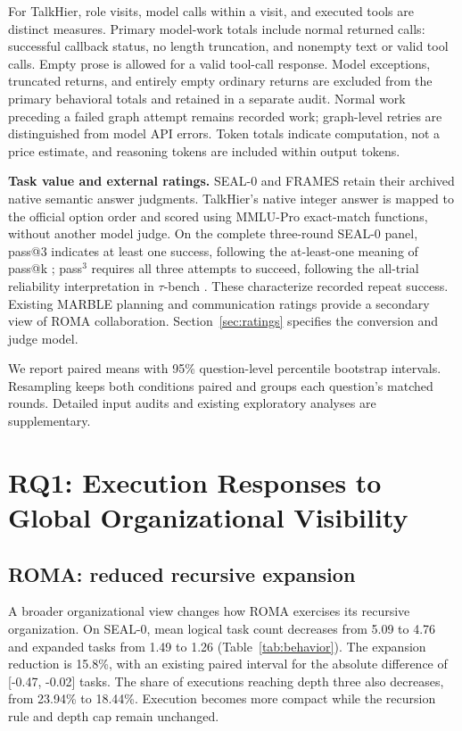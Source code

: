 \documentclass[10pt,letterpaper,twocolumn]{article}
\begin{document}
For TalkHier, role visits, mod\-el calls within a visit, and ex\-e\-cut\-ed tools are distinct mea\-sures. Primary mod\-el-work totals include normal returned calls: successful callback status, no length truncation, and nonempty text or valid tool calls. Empty prose is allowed for a valid tool-call response. Model exceptions, truncated returns, and entirely empty ordinary returns are excluded from the primary behavioral totals and retained in a separate audit. Normal work preceding a failed graph attempt remains re\-cord\-ed work; graph-level retries are distinguished from mod\-el API errors. Token totals in\-di\-cate com\-pu\-ta\-tion, not a price estimate, and reasoning tokens are included within output tokens.

\textbf{Task value and external ratings.} SEAL-0 and FRAMES retain their ar\-chived na\-tive semantic answer judgments. TalkHier's na\-tive integer answer is mapped to the official option order and scored using MMLU-Pro exact-match functions, without another mod\-el judge. On the complete three-round SEAL-0 panel, pass@3 indicates at least one success, following the at-least-one meaning of pass@k \cite{humaneval}; pass$^3$ requires all three attempts to succeed, following the all-trial reliability interpretation in $\tau$-bench \cite{taubench}. These characterize re\-cord\-ed repeat success. Existing MARBLE planning and communication ratings provide a secondary view of ROMA collaboration. Section~\ref{sec:ratings} specifies the conversion and judge model.

We report paired means with 95\% question-level percentile bootstrap intervals. Resampling keeps both conditions paired and groups each question's matched rounds. Detailed input audits and ex\-ist\-ing exploratory analyses are supplementary.

\section{RQ1: Execution Responses to Global Organizational Visibility}
\subsection{ROMA: re\-duced re\-cur\-sive ex\-pan\-sion}
A broad\-er or\-ga\-ni\-za\-tion\-al view changes how ROMA exercises its re\-cur\-sive or\-ga\-ni\-za\-tion. On SEAL-0, mean logical task count decreases from 5.09 to 4.76 and expanded tasks from 1.49 to 1.26 (Table~\ref{tab:behavior}). The ex\-pan\-sion re\-duc\-tion is 15.8\%, with an ex\-ist\-ing paired interval for the absolute difference of [-0.47, -0.02] tasks. The share of executions reaching depth three also decreases, from 23.94\% to 18.44\%. Execution becomes more com\-pact while the re\-cur\-sion rule and depth cap remain unchanged.
\end{document}
